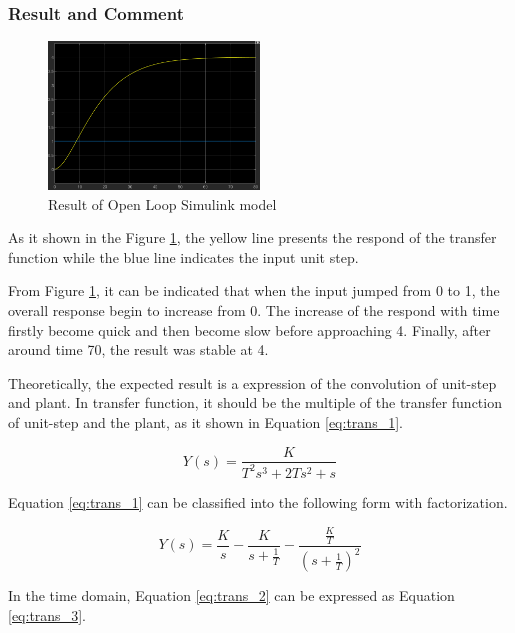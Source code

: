 \documentclass[11pt, a4paper]{article}
\begin{document}
\subsubsection{Result and Comment}

\begin{figure}[htbp]     \begin{centering}
    \includegraphics[width=0.5\textwidth]{p1_1_r.png}
    \caption{\label{Fig:p1_1_r}Result of Open Loop Simulink model}
    \end{centering}
\end{figure}

As it shown in the Figure \ref{Fig:p1_1_r}, the yellow line presents the respond of the transfer function while the blue line indicates the input unit step.

From Figure \ref{Fig:p1_1_r}, it can be indicated that when the input jumped from 0 to 1, the overall response begin to increase from 0. The increase of the respond with time firstly become quick and then become slow before approaching 4. Finally, after around time 70, the result was stable at 4. 

Theoretically, the expected result is a expression of the convolution of unit-step and plant. In transfer function, it should be the multiple of the transfer function of unit-step and the plant, as it shown in Equation \ref{eq:trans_1}.

\begin{equation}
Y(s) = \frac{K}{T^2s^3+2Ts^2+s}
\label{eq:trans_1}
\end{equation}

Equation \ref{eq:trans_1} can be classified into the following form with factorization.

\begin{equation}
Y(s) = \frac{K}{s}-\frac{K}{s+\frac{1}{T}}-\frac{\frac{K}{T}}{(s+\frac{1}{T})^2}
\label{eq:trans_2}
\end{equation}

In the time domain, Equation \ref{eq:trans_2} can be expressed as Equation \ref{eq:trans_3}.
\end{document}
